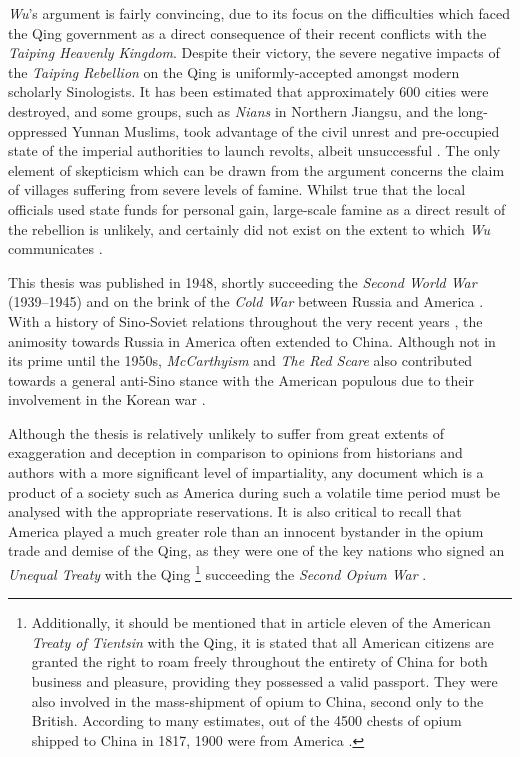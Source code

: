 \documentclass[a4paper,oneside]{article}
\begin{document}
\textit{Wu}'s argument is fairly convincing, due to its focus on the
difficulties which faced the Qing government as a direct consequence of their
recent conflicts with the \textit{Taiping Heavenly Kingdom}. Despite their
victory, the severe negative impacts of the \textit{Taiping Rebellion} on the
Qing is uniformly-accepted amongst modern scholarly Sinologists. It has been
estimated that approximately 600 cities were destroyed, and some groups, such as
\textit{Nians} in Northern Jiangsu, and the long-oppressed Yunnan Muslims, took
advantage of the civil unrest and pre-occupied state of the imperial authorities
to launch revolts, albeit unsuccessful \autocite{Tucker:2017}. The only element
of skepticism which can be drawn from the argument concerns the claim of
villages suffering from severe levels of famine. Whilst true that the local
officials used state funds for personal gain, large-scale famine as a direct
result of the rebellion is unlikely, and certainly did not exist on the extent
to which \textit{Wu} communicates \autocite{Grada:2009}.

This thesis was published in 1948, shortly succeeding the \textit{Second World
War} (1939--1945) and on the brink of the \textit{Cold War} between Russia and
America \autocite{Leffler:2010}. With a history of Sino-Soviet relations
throughout the very recent years \autocite{Garver:1989}, the animosity towards
Russia in America often extended to China. Although not in its prime until the
1950s, \textit{McCarthyism} and \textit{The Red Scare} also contributed towards
a general anti-Sino stance with the American populous due to their involvement
in the Korean war \autocite{Schrecker:1998}.

Although the thesis is relatively unlikely to suffer from great extents of
exaggeration and deception in comparison to opinions from historians and authors
with a more significant level of impartiality, any document which is a product
of a society such as America during such a volatile time period must be analysed
with the appropriate reservations. It is also critical to recall that America
played a much greater role than an innocent bystander in the opium trade and
demise of the Qing, as they were one of the key nations who signed an
\textit{Unequal Treaty} with the Qing
\autocite{Peters:1961}\footnote{Additionally, it should be mentioned that in
article eleven of the American \textit{Treaty of Tientsin} with the Qing, it is
stated that all American citizens are granted the right to roam freely
throughout the entirety of China for both business and pleasure, providing they
possessed a valid passport.  They were also involved in the mass-shipment of
opium to China, second only to the British. According to many estimates, out of
the 4500 chests of opium shipped to China in 1817, 1900 were from America
\autocite{Hu:1991}.} succeeding the \textit{Second Opium War}
\autocite{Johnstone:1937}.
\end{document}
